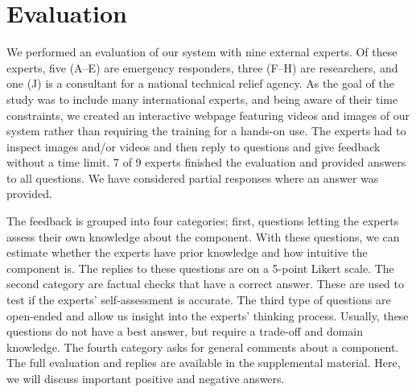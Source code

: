 \documentclass[conference,10pt,letter]{IEEEtran}
\begin{document}

\section{Evaluation} \label{sec:evaluation}
We performed an evaluation of our system with nine external experts. Of these experts, five (A--E) are emergency responders, three (F--H) are researchers, and one (J) is a consultant for a national technical relief agency. As the goal of the study was to include many international experts, and being aware of their time constraints, we created an interactive webpage featuring videos and images of our system rather than requiring the training for a hands-on use. The experts had to inspect images and/or videos and then reply to questions and give feedback without a time limit. 7 of 9 experts finished the evaluation and provided answers to all questions. We have considered partial responses where an answer was provided.

The feedback is grouped into four categories; first, questions letting the experts assess their own knowledge about the component. With these questions, we can estimate whether the experts have prior knowledge and how intuitive the component is. The replies to these questions are on a 5-point Likert scale. The second category are factual checks that have a correct answer. These are used to test if the experts' self-assessment is accurate. The third type of questions are open-ended and allow us insight into the experts' thinking process. Usually, these questions do not have a best answer, but require a trade-off and domain knowledge. The fourth category asks for general comments about a component. The full evaluation and replies are available in the supplemental material. Here, we will discuss important positive and negative answers. 
\end{document}
